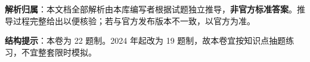 

\begin{gknotice}
\textbf{解析归属}：本文档全部解析由本库编写者根据试题独立推导，\textbf{非官方标准答案}。推导过程完整给出以便核验；若与官方发布版本不一致，以官方为准。

\textbf{结构提示}：本卷为 22 题制。2024 年起改为 19 题制，故本卷宜按知识点抽题练习，不宜整套限时模拟。
\end{gknotice}

\par\medskip


